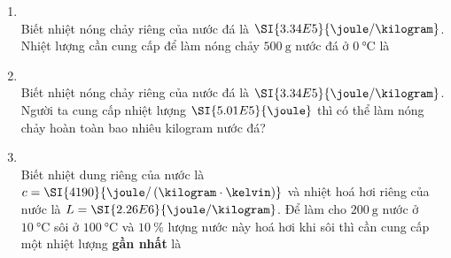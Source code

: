 \begin{enumerate}[label=\bfseries Câu \arabic*:, leftmargin=1.7cm]
\item {}\\
Biết nhiệt nóng chảy riêng của nước đá là $\SI{3.34E5}{\joule/\kilogram}$. Nhiệt lượng cần cung cấp để làm nóng chảy $\SI{500}{\gram}$ nước đá ở $\SI{0}{\celsius}$ là

\item {}\\
Biết nhiệt nóng chảy riêng của nước đá là $\SI{3.34E5}{\joule/\kilogram}$. Người ta cung cấp nhiệt lượng $\SI{5.01E5}{\joule}$ thì có thể làm nóng chảy hoàn toàn bao nhiêu kilogram nước đá?

\item {}\\
Biết nhiệt dung riêng của nước là $c=\SI{4190}{\joule/\left(\kilogram\cdot\kelvin\right)}$ và nhiệt hoá hơi riêng của nước là $L=\SI{2.26E6}{\joule/\kilogram}$. Để làm cho $\SI{200}{\gram}$ nước ở $\SI{10}{\celsius}$ sôi ở $\SI{100}{\celsius}$ và $\SI{10}{\percent}$ lượng nước này hoá hơi khi sôi thì cần cung cấp một nhiệt lượng \textbf{gần nhất} là


\end{enumerate}
